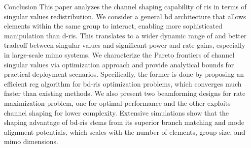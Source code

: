 \documentclass[journal]{IEEEtran}
\begin{document}
\begin{section}{Conclusion}
	This paper analyzes the channel shaping capability of \gls{ris} in terms of singular values redistribution.
	We consider a general \gls{bd} architecture that allows elements within the same group to interact, enabling more sophisticated manipulation than \gls{d}-\gls{ris}.
	This translates to a wider dynamic range of and better tradeoff between singular values and significant power and rate gains, especially in large-scale \gls{mimo} systems.
	We characterize the Pareto frontiers of channel singular values via optimization approach and provide analytical bounds for practical deployment scenarios.
	Specifically, the former is done by proposing an efficient \gls{rcg} algorithm for \gls{bd}-\gls{ris} optimization problems, which converges much faster than existing methods.
	We also present two beamforming designs for rate maximization problem, one for optimal performance and the other exploits channel shaping for lower complexity.
	Extensive simulations show that the shaping advantage of \gls{bd}-\gls{ris} stems from its superior branch matching and mode alignment potentials, which scales with the number of elements, group size, and \gls{mimo} dimensions.

\end{section}

\end{document}
